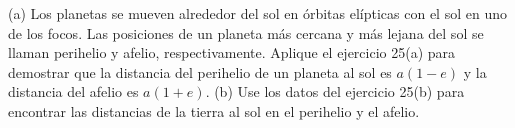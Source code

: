 \item (a) Los planetas se mueven alrededor del sol en órbitas elípticas con el sol en uno de los focos. Las posiciones de un planeta más cercana y más lejana del sol se llaman perihelio y afelio, respectivamente. Aplique el ejercicio 25(a) para demostrar que la distancia del perihelio de un planeta al sol es $a(1 - e)$ y la distancia del afelio es $a(1 + e)$.
    (b) Use los datos del ejercicio 25(b) para encontrar las distancias de la tierra al sol en el perihelio y el afelio.
